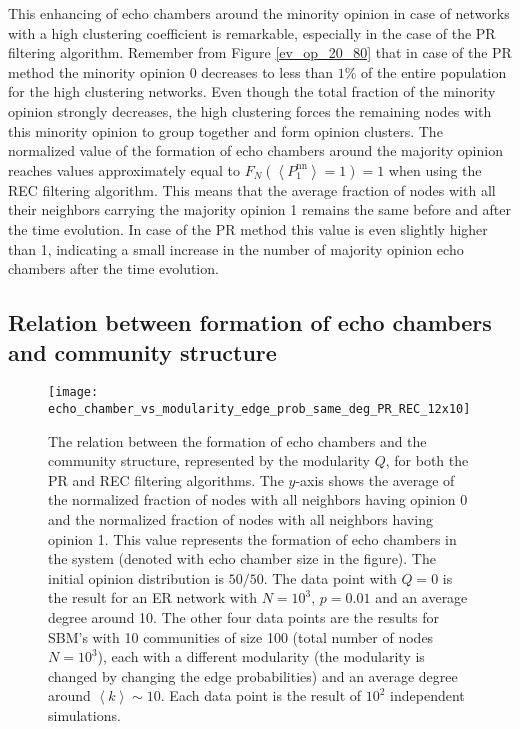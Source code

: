 \documentclass[11 pt , letterpaper , twoside , openright]{book}
\begin{document}
This enhancing of echo chambers around the minority opinion in case of networks with a high clustering coefficient is remarkable, especially in the case of the PR filtering algorithm. Remember from Figure \ref{ev_op_20_80} that in case of the PR method the minority opinion 0 decreases to less than $1 \%$ of the entire population for the high clustering networks. Even though the total fraction of the minority opinion strongly decreases, the high clustering forces the remaining nodes with this minority opinion to group together and form opinion clusters. The normalized value of the formation of echo chambers around the majority opinion reaches values approximately equal to $F_N(\left<P_1^{\text{nn}}\right> = 1) = 1$ when using the REC filtering algorithm. This means that the average fraction of nodes with all their neighbors carrying the majority opinion 1 remains the same before and after the time evolution. In case of the PR method this value is even slightly higher than 1, indicating a small increase in the number of majority opinion echo chambers after the time evolution. 


\subsection{Relation between formation of echo chambers and community structure}\label{echoVSmod}

\begin{figure}[H]
	\texttt{[image: echo\_chamber\_vs\_modularity\_edge\_prob\_same\_deg\_PR\_REC\_12x10]}
	\captionsetup{format=plain}
	\caption[Relation between the formation of echo chambers and community structure (modularity)]{The relation between the formation of echo chambers and the community structure, represented by the modularity $Q$, for both the PR and REC filtering algorithms. The $y$-axis shows the average of the normalized fraction of nodes with all neighbors having opinion 0 and the normalized fraction of nodes with all neighbors having opinion 1. This value represents the formation of echo chambers in the system (denoted with echo chamber size in the figure). The initial opinion distribution is $50/50$. The data point with $Q = 0$ is the result for an ER network with $N = 10^3$, $p = 0.01$ and an average degree around 10. The other four data points are the results for SBM's with 10 communities of size 100 (total number of nodes $N = 10^3$), each with a different modularity (the modularity is changed by changing the edge probabilities) and an average degree around $\left<k\right> \sim 10$. Each data point is the result of $10^2$ independent simulations.}
\label{echo_vs_mod}
\end{figure}
\end{document}
